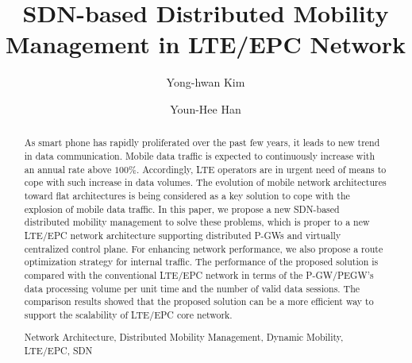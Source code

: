 \documentclass[runningheads,a4paper]{llncs}
\newcommand{\keywords}[1]{\par\addvspace\baselineskip
\noindent\keywordname\enspace\ignorespaces#1}
\begin{document}
\mainmatter  %

\title{SDN-based Distributed Mobility Management in LTE/EPC Network}


%
%

\author{Yong-hwan Kim\inst{}
\and Youn-Hee Han\inst{}}
%


%
%

\maketitle


\begin{abstract}
As smart phone has rapidly proliferated over the past few years, it leads to new trend in data communication. Mobile data traffic is expected to continuously increase with an annual rate above $100\%$. Accordingly, LTE operators are in urgent need of means to cope with such increase in data volumes. The evolution of mobile network architectures toward flat architectures is being considered as a key solution to cope with the explosion of mobile data traffic. In this paper, we propose a new SDN-based distributed mobility management to solve these problems, which is proper to a new LTE/EPC network architecture supporting distributed P-GWs and virtually centralized control plane. For enhancing network performance, we also propose a route optimization strategy for internal traffic. The performance of the proposed solution is compared with the conventional LTE/EPC network in terms of the P-GW/PEGW's data processing volume per unit time and the number of valid data sessions. The comparison results showed that the proposed solution can be a more efficient way to support the scalability of LTE/EPC core network.

\keywords{Network Architecture, Distributed Mobility Management, Dynamic Mobility, LTE/EPC, SDN}
\end{abstract}
\end{document}

